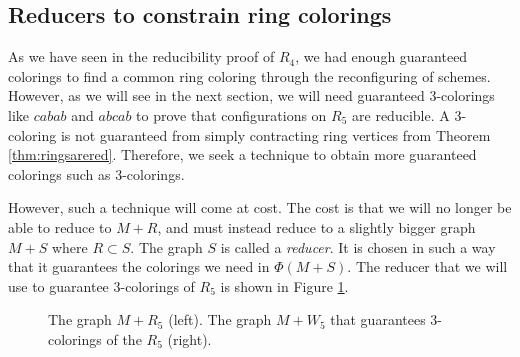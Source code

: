 \subsection{Reducers to constrain ring colorings}
\label{sec:reducers}

As we have seen in the reducibility proof of $R_4$, we had enough guaranteed colorings to find a common ring coloring through the reconfiguring of schemes. However, as we will see in the next section, we will need guaranteed 3-colorings like $cabab$ and $abcab$ to prove that configurations on $R_5$ are reducible. A 3-coloring is not guaranteed from simply contracting ring vertices from Theorem \ref{thm:ringsarered}. Therefore, we seek a technique to obtain more guaranteed colorings such as 3-colorings.

However, such a technique will come at cost. The cost is that we will no longer be able to reduce to $M+R$, and must instead reduce to a slightly bigger graph $M+S$ where $R \subset S$. The graph $S$ is called a \textit{reducer}. It is chosen in such a way that it guarantees the colorings we need in $\Phi(M+S)$. The reducer that we will use to guarantee 3-colorings of $R_5$ is shown in Figure \ref{fig:reducertut}.

\begin{figure}[!h]
    \centering
    \hspace{1cm}
    \caption{The graph $M+R_5$ (left). The graph $M+W_5$ that guarantees 3-colorings of the $R_5$ (right).}
    \label{fig:reducertut}
\end{figure}

